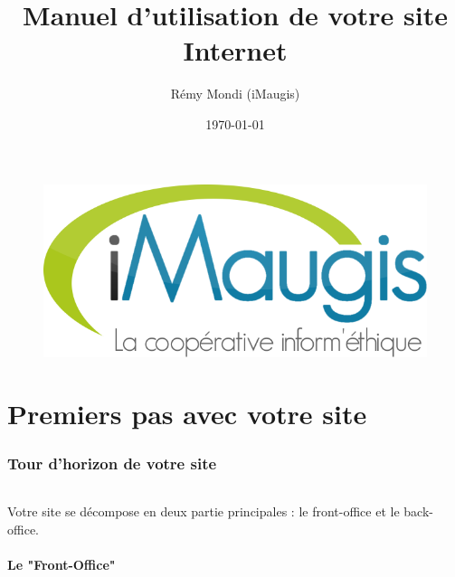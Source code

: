 \documentclass[10pt,a4paper]{article}
\title{Manuel d'utilisation de votre site Internet}
\author{Rémy Mondi (iMaugis)}
\date{\today}
\begin{document}
\maketitle
\begin{figure}[!h]
\begin{center}
\includegraphics[scale=0.5]{img/logo-imaugis.png}
\end{center}
\end{figure}
\newpage

\tableofcontents
\newpage

\part{Premiers pas avec votre site}
\newpage

\section{Tour d'horizon de votre site}
\paragraph{}Votre site se décompose en deux partie principales : le front-office et le back-office.
\subsection{Le "Front-Office"}
\end{document}
